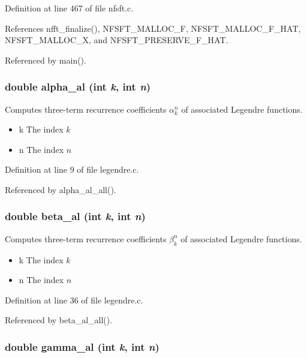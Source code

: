 Definition at line 467 of file nfsft.c.

References nfft\_\-finalize(), NFSFT\_\-MALLOC\_\-F, NFSFT\_\-MALLOC\_\-F\_\-HAT, NFSFT\_\-MALLOC\_\-X, and NFSFT\_\-PRESERVE\_\-F\_\-HAT.

Referenced by main().\hypertarget{group__nfsft_ga12}{
\subsubsection[alpha\_\-al]{\setlength{\rightskip}{0pt plus 5cm}double alpha\_\-al (int {\em k}, int {\em n})}}
\label{group__nfsft_ga12}


Computes three-term recurrence coefficients $\alpha_k^n$ of associated Legendre functions. 

\begin{itemize}
\item k The index $k$ \item n The index $n$ \end{itemize}


Definition at line 9 of file legendre.c.

Referenced by alpha\_\-al\_\-all().\hypertarget{group__nfsft_ga13}{
\subsubsection[beta\_\-al]{\setlength{\rightskip}{0pt plus 5cm}double beta\_\-al (int {\em k}, int {\em n})}}
\label{group__nfsft_ga13}


Computes three-term recurrence coefficients $\beta_k^n$ of associated Legendre functions. 

\begin{itemize}
\item k The index $k$ \item n The index $n$ \end{itemize}


Definition at line 36 of file legendre.c.

Referenced by beta\_\-al\_\-all().\hypertarget{group__nfsft_ga14}{
\subsubsection[gamma\_\-al]{\setlength{\rightskip}{0pt plus 5cm}double gamma\_\-al (int {\em k}, int {\em n})}}
\label{group__nfsft_ga14}



